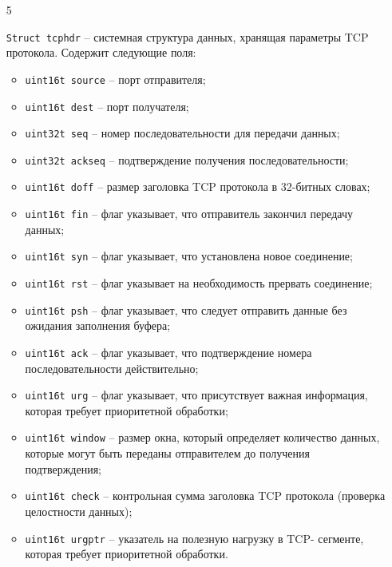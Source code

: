 \begin{enumerate}
    \item[5] {{\texttt{Struct tcphdr}} -- системная структура данных, хранящая параметры TCP
    протокола. Содержит следующие поля:
        \begin{itemize}
            \item \texttt{u{\textunderscore}int16{\textunderscore}t source} -- порт отправителя;
            \item \texttt{u{\textunderscore}int16{\textunderscore}t dest} -- порт получателя;
            \item \texttt{u{\textunderscore}int32{\textunderscore}t seq} -- номер последовательности для передачи данных;
            \item \texttt{u{\textunderscore}int32{\textunderscore}t ack{\textunderscore}seq} -- подтверждение получения
            последовательности;
            \item \texttt{u{\textunderscore}int16{\textunderscore}t doff} -- размер заголовка TCP протокола в 32-битных
            словах;
            \item \texttt{u{\textunderscore}int16{\textunderscore}t fin} -- флаг указывает, что отправитель закончил
            передачу данных;
            \item \texttt{u{\textunderscore}int16{\textunderscore}t syn} -- флаг указывает, что установлена новое
            соединение;
            \item \texttt{u{\textunderscore}int16{\textunderscore}t rst} -- флаг указывает на необходимость прервать
            соединение;
            \item \texttt{u{\textunderscore}int16{\textunderscore}t psh} -- флаг указывает, что следует отправить данные
            без ожидания заполнения буфера;
            \item \texttt{u{\textunderscore}int16{\textunderscore}t ack} -- флаг указывает, что подтверждение номера
            последовательности действительно;
            \item \texttt{u{\textunderscore}int16{\textunderscore}t urg} -- флаг указывает, что присутствует важная
            информация, которая требует приоритетной обработки;
            \item \texttt{u{\textunderscore}int16{\textunderscore}t window} -- размер окна, который определяет количество
            данных, которые могут быть переданы отправителем до получения
            подтверждения;
            \item \texttt{u{\textunderscore}int16{\textunderscore}t check} -- контрольная сумма заголовка TCP протокола
            (проверка целостности данных);
            \item \texttt{u{\textunderscore}int16{\textunderscore}t urg{\textunderscore}ptr} -- указатель на полезную нагрузку в TCP-
            сегменте, которая требует приоритетной обработки.
        \end{itemize}}


\end{enumerate}
